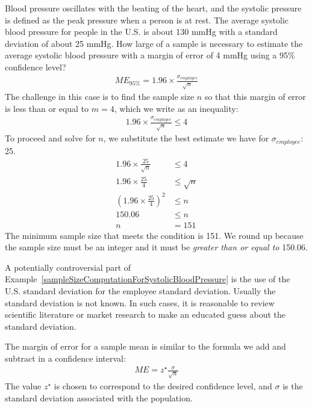 \begin{example}{Blood pressure oscillates with the beating of the heart, and the systolic pressure is defined as the peak pressure when a person is at rest. The average systolic blood pressure for people in the U.S. is about 130 mmHg with a standard deviation of about 25 mmHg. How large of a sample is necessary to estimate the average systolic blood pressure with a margin of error of 4 mmHg using a 95\% confidence level?}
\label{sampleSizeComputationForSystolicBloodPressure}
\begin{align*}
ME_{95\%} = 1.96\times\frac{\sigma_{employee}}{\sqrt{n}}
\end{align*}
The challenge in this case is to find the sample size $n$ so that this margin of error is less than or equal to $m = 4$, which we write as an inequality:
\begin{align*}
1.96\times \frac{\sigma_{employee}}{\sqrt{n}} \leq 4
\end{align*}
To proceed and solve for $n$, we substitute the best estimate we have for $\sigma_{employee}$: 25.
\begin{align*}
1.96\times\frac{25}{\sqrt{n}}
	&\leq 4 \\
1.96\times\frac{25}{4} &\leq \sqrt{n} \\
\left(1.96\times\frac{25}{4}\right)^2 &\leq n \\
150.06 &\leq n \\
 n &= 151
\end{align*}
The minimum sample size that meets the condition is 151. We round up because the sample size must be an integer and it must be  \emph{greater than or equal to} 150.06.
\end{example}

A potentially controversial part of Example~\ref{sampleSizeComputationForSystolicBloodPressure} is the use of the U.S. standard deviation for the employee standard deviation. Usually the standard deviation is not known. In such cases, it is reasonable to review scientific literature or market research to make an educated guess about the standard deviation.

\begin{termBox}{
The margin of error for a sample mean is similar to the formula we add and subtract in a confidence interval:
\begin{align*}
ME = z^{\star}\frac{\sigma}{\sqrt{n}}
\end{align*}
The value $z^{\star}$ is chosen to correspond to the desired confidence level, and $\sigma$ is the standard deviation associated with the population.}
\end{termBox}

